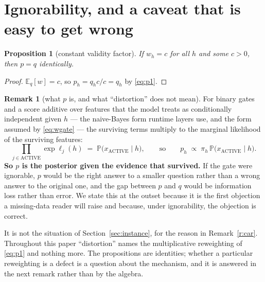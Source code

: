 \documentclass[11pt,a4paper]{article}
\newtheorem{proposition}{Proposition}
\theoremstyle{definition}
\newtheorem{remark}{Remark}
\begin{document}
\section{Ignorability, and a caveat that is easy to get wrong}
\label{sec:ignorable}

\begin{proposition}[constant validity factor]\label{p:c2}
If $w_h=c$ for all $h$ and some $c>0$, then $p=q$ identically.
\end{proposition}
\begin{proof}
$\mathbb{E}_q[w]=c$, so $p_h=q_h c/c=q_h$ by \eqref{eq:p1}.
\end{proof}

\begin{remark}[what $p$ is, and what ``distortion'' does not
mean]\label{r:marginal}
For binary gates and a score additive over features that the model treats as
conditionally independent given $h$ --- the naive-Bayes form runtime layers
use, and the form assumed by \eqref{eq:wgate} --- the surviving terms multiply
to the marginal likelihood of the surviving features:
\begin{equation}
\prod_{j\in\mathrm{ACTIVE}}\exp\ell_j(h)
\;=\; \mathbb{P}\big(x_{\mathrm{ACTIVE}} \mid h\big),
\qquad\text{so}\qquad
p_h \;\propto\; \pi_h\,\mathbb{P}\big(x_{\mathrm{ACTIVE}} \mid h\big).
\label{eq:marginal}
\end{equation}
\textbf{So $p$ is the posterior given the evidence that survived.} If the gate
were ignorable, $p$ would be the right answer to a smaller question rather
than a wrong answer to the original one, and the gap between $p$ and $q$ would
be information loss rather than error. We state this at the outset because it
is the first objection a missing-data reader will raise and because, under
ignorability, the objection is correct.

It is not the situation of Section~\ref{sec:instance}, for the reason in
Remark~\ref{r:car}. Throughout this paper ``distortion'' names the
multiplicative reweighting of \eqref{eq:p1} and nothing more. The
propositions are identities; whether a particular reweighting is a defect is a
question about the mechanism, and it is answered in the next remark rather
than by the algebra.
\end{remark}
\end{document}
